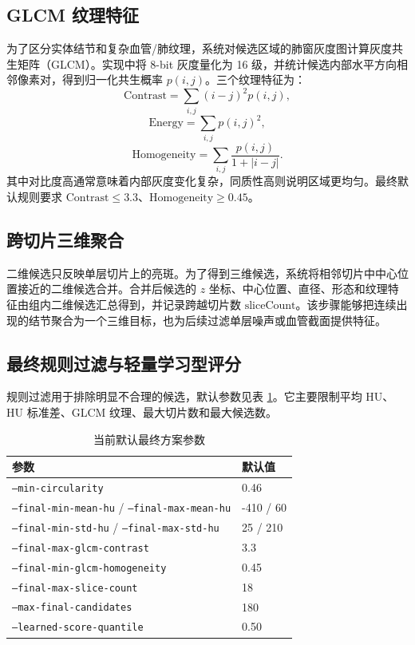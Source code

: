 \documentclass[UTF8,zihao=-4,fontset=none]{ctexart}
\newcommand{\code}[1]{\texttt{#1}}
\begin{document}
\subsection{GLCM 纹理特征}

为了区分实体结节和复杂血管/肺纹理，系统对候选区域的肺窗灰度图计算灰度共生矩阵（GLCM）。实现中将 8-bit 灰度量化为 16 级，并统计候选内部水平方向相邻像素对，得到归一化共生概率 \(p(i,j)\)。三个纹理特征为：
\[
\text{Contrast}=\sum_{i,j}(i-j)^2p(i,j),
\]
\[
\text{Energy}=\sum_{i,j}p(i,j)^2,
\]
\[
\text{Homogeneity}=\sum_{i,j}\frac{p(i,j)}{1+|i-j|}.
\]
其中对比度高通常意味着内部灰度变化复杂，同质性高则说明区域更均匀。最终默认规则要求 \(\text{Contrast}\leq 3.3\)、\(\text{Homogeneity}\geq 0.45\)。

\subsection{跨切片三维聚合}

二维候选只反映单层切片上的亮斑。为了得到三维候选，系统将相邻切片中中心位置接近的二维候选合并。合并后候选的 \(z\) 坐标、中心位置、直径、形态和纹理特征由组内二维候选汇总得到，并记录跨越切片数 \(\text{sliceCount}\)。该步骤能够把连续出现的结节聚合为一个三维目标，也为后续过滤单层噪声或血管截面提供特征。

\subsection{最终规则过滤与轻量学习型评分}

规则过滤用于排除明显不合理的候选，默认参数见表 \ref{tab:default-params}。它主要限制平均 HU、HU 标准差、GLCM 纹理、最大切片数和最大候选数。

\begin{table}[H]
\centering
\caption{当前默认最终方案参数}
\label{tab:default-params}
\begin{tabular}{ll}
\toprule
参数 & 默认值 \\
\midrule
\code{--min-circularity} & 0.46 \\
\code{--final-min-mean-hu} / \code{--final-max-mean-hu} & -410 / 60 \\
\code{--final-min-std-hu} / \code{--final-max-std-hu} & 25 / 210 \\
\code{--final-max-glcm-contrast} & 3.3 \\
\code{--final-min-glcm-homogeneity} & 0.45 \\
\code{--final-max-slice-count} & 18 \\
\code{--max-final-candidates} & 180 \\
\code{--learned-score-quantile} & 0.50 \\
\bottomrule
\end{tabular}
\end{table}
\end{document}

